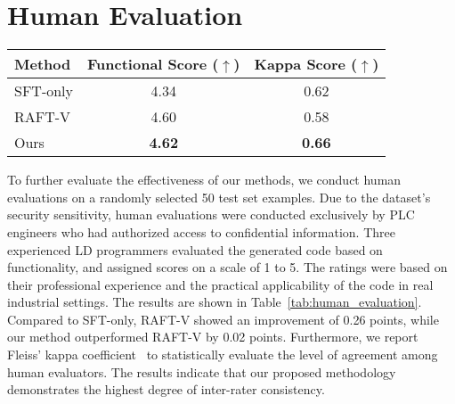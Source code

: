 \section{\label{sec:human_eval}Human Evaluation}

\begin{table*}[!htbp]
\centering
\begin{tabular}{@{}lcc@{}}
\toprule
Method        & Functional Score ($\uparrow$) & Kappa Score ($\uparrow$) \\ \midrule
SFT-only      & 4.34            &       0.62      \\
RAFT-V        & 4.60            &         0.58    \\
Ours & \textbf{4.62} & \textbf{0.66}   \\ \bottomrule
\end{tabular}
\caption{Average of human evaluation results. We used the metaprogram format for evaluation.}
\label{tab:human_evaluation}
\end{table*}

To further evaluate the effectiveness of our methods, we conduct human evaluations on a randomly selected 50 test set examples. Due to the dataset's security sensitivity, human evaluations were conducted exclusively by PLC engineers who had authorized access to confidential information. 
Three experienced LD programmers evaluated the generated code based on functionality, and assigned scores on a scale of 1 to 5.
The ratings were based on their professional experience and the practical applicability of the code in real industrial settings. The results are shown in Table~\ref{tab:human_evaluation}. Compared to SFT-only, RAFT-V showed an improvement of 0.26 points, while our method outperformed RAFT-V by 0.02 points. Furthermore, we report Fleiss' kappa coefficient~\citep{fleiss1971measuring} to statistically evaluate the level of agreement among human evaluators. The results indicate that our proposed methodology demonstrates the highest degree of inter-rater consistency.
